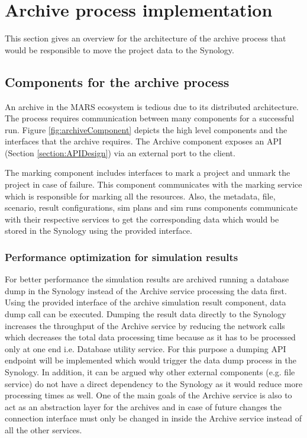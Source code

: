 \section{Archive process implementation}
This section gives an overview for the architecture of the archive process that would be responsible
to move the project data to the Synology. 

\subsection{Components for the archive process}
An archive in the MARS ecosystem is tedious due to its distributed architecture. The process requires communication between many components for a 
successful run. Figure \ref{fig:archiveComponent} depicts the high level components and the interfaces that the archive requires. The Archive
component exposes an API (Section \ref{section:APIDesign}) via an external port to the client. 

The marking component includes interfaces to mark a project and unmark the project in case of failure. This component communicates with the marking service which
is responsible for marking all the resources. Also, the metadata, file, scenario, result configurations, sim plans and sim runs components communicate with 
their respective services to get the corresponding data which would be stored in the Synology using the provided interface.

\subsubsection{Performance optimization for simulation results}
\label{subsubsec:performanceSim}
For better performance
the simulation results are archived running a database dump in the Synology instead of the Archive service processing the data first. Using the provided interface of
the archive simulation result component, data dump call can be executed. 
Dumping the result data directly to the Synology increases the throughput of the Archive service by reducing the network calls which decreases the total data processing
time because as it has to be processed only at one end i.e. Database utility service. For this purpose a dumping API endpoint will be implemented which would trigger the data dump process in the 
Synology. In addition, it can be argued why other external components (e.g. file service) do not have a direct dependency to the Synology as it would reduce more
processing times as well. One of the main goals of the Archive service is also to act as an abstraction layer for the archives and in case of future changes the
connection interface must only be changed in inside the Archive service instead of all the other services.

